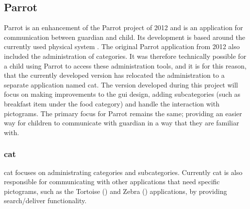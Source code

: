 \subsection{Parrot}
Parrot is an enhancement of the Parrot project of 2012 and is an application for communication between guardian and child. Its development is based around the currently used physical system . The original Parrot application from 2012 also included the administration of categories. It was therefore technically possible for a child using Parrot to access these administration tools, and it is for this reason, that the currently developed version has relocated the administration to a separate application named \acl{cat}. The version developed during this project will focus on making improvements to the \ac{gui} design, adding subcategories (such as breakfast item under the food category) and handle the interaction with pictograms. %
The primary focus for Parrot remains the same; providing an easier way for children to communicate with guardian in a way that they are familiar with.

\subsubsection*{\acl{cat}}
\label{subsub:cat}
\ac{cat} focuses on administrating categories and subcategories. Currently \ac{cat} is also responsible for communicating with other applications that need specific pictograms, such as the Tortoise () and Zebra () applications, by providing search/deliver functionality. %
